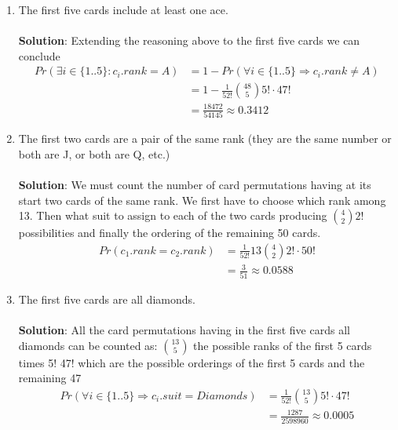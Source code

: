 \documentclass[a4paper]{article}
\begin{document}
\begin{enumerate}
\begin{enumerate}
            \item The first five cards include at least one ace. \\ \\
            \textbf{Solution}: Extending the reasoning above to the first five cards we can conclude
            \begin{align*}
                Pr(\exists i \in \{1..5\}: c_i.rank = A) &= 1 - Pr(\forall i \in \{1..5\} \Rightarrow c_i.rank \neq A) \\
                                                         &= 1 - \frac{1}{52!}\binom{48}{5}5!\cdot 47! \\
                                                         &= \frac{18472}{54145} \approx 0.3412
            \end{align*}
            
            \newpage
            
            \item  The first two cards are a pair of the same rank (they are the same number or both are
J, or both are Q, etc.) \\ \\
            \textbf{Solution}: We must count the number of card permutations having at its start two cards of the same rank. We first have to choose which rank among 13. Then what suit to assign to each of the two cards producing $\binom{4}{2} 2!$ possibilities and finally the ordering of the remaining 50 cards.
            \begin{align*}
                Pr(c_1.rank = c_2.rank) &= \frac{1}{52!} 13 \binom{4}{2} 2! \cdot 50! \\
                                        &= \frac{3}{51} \approx 0.0588
            \end{align*}
            
            \item The first five cards are all diamonds. \\ \\
            \textbf{Solution}: All the card permutations having in the first five cards all diamonds can be counted as: $\binom{13}{5}$ the possible ranks of the first 5 cards times 5! 47! which are the possible orderings of the first 5 cards and the remaining 47
            \begin{align*}
                Pr(\forall i \in \{1..5\} \Rightarrow c_i.suit = Diamonds) &= \frac{1}{52!} \binom{13}{5} 5! \cdot 47! \\
                &= \frac{1287}{2598960} \approx 0.0005
            \end{align*}
            

\end{enumerate}
\end{enumerate}
\end{document}
